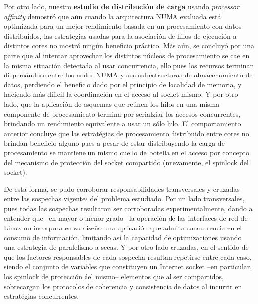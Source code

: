 \begin{conclusion}
 
Por otro lado, nuestro \textbf{estudio de distribución de carga} usando \emph{processor affinity} demostró que aún cuando la arquitectura NUMA evaluada está optimizada para un mejor rendimiento basada en un procesamiento con datos distribuidos, las estrategias usadas para la asociación de hilos de ejecución a distintos cores no mostró ningún beneficio práctico. Más aún, se concluyó por una parte que al intentar aprovechar los distintos núcleos de procesamiento se cae en la misma situación detectada al usar concurrencia, ello pues los recursos terminan dispersándose entre los nodos NUMA y sus subestructuras de almacenamiento de datos, perdiendo el beneficio dado por el principio de localidad de memoria, y haciendo más dificil la coordinación en el acceso al socket mismo. Y por otro lado, que la aplicación de esquemas que reúnen los hilos en una misma componente de procesamiento termina por serialziar los accesos concurrentes, brindando un rendimiento equivalente a usar un sólo hilo. El comportamiento anterior concluye que las estratégias de procesamiento distribuido entre cores no brindan beneficio alguno pues a pesar de estar distribuyendo la carga de procesamiento se mantiene un mismo cuello de botella en el acceso por concepto del mecanismo de protección del socket compartido (nuevamente, el spinlock del socket). 
 
 
De esta forma, se pudo corroborar responsabilidades transversales y cruzadas entre las sospechas vigentes del problema estudiado. Por un lado transversales, pues todas las sospechas resultaron ser corroboradas experimentalmente, dando a entender que --en mayor o menor grado-- la operación de las interfaces de red de Linux no incorpora en su diseño una aplicación que admita concurrencia en el consumo de información, limitando así la capacidad de optimizaciones usando una estrategia de paralelismo a secas. Y por otro lado cruzadas, en el sentido de que los factores responsables de cada sospecha resultan repetirse entre cada caso, siendo el conjunto de variables que constituyen un Internet socket --en particular, los spinlock de protección del mismo-- elementos que al ser compartidos, sobrecargan los protocolos de coherencia y consistencia de datos al incurrir en estratégias concurrentes.
 

\end{conclusion}
